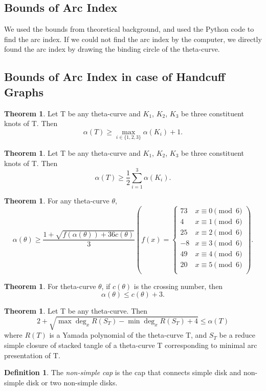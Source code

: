 \documentclass{article}
\theoremstyle{definition}
\newtheorem{defn}[thm]{Definition}
\theoremstyle{theorem}
\newtheorem{theorem}[thm]{Theorem}
\theoremstyle{proposition}
\theoremstyle{corollary}
\begin{document}
\subsection{Bounds of Arc Index}
We used the bounds from theoretical background, and used the Python code to find the arc index. If we could not find the arc index by the computer, we directly found the arc index by drawing the binding circle of the theta-curve.

\subsection{Bounds of Arc Index in case of Handcuff Graphs}
\begin{theorem}
Let T be any theta-curve and $K_1$, $K_2$, $K_3$ be three constituent knots of T. Then $$\alpha(T) \geq \underset{i \in \{1,2,3\}}\max \alpha(K_i) + 1.$$
\end{theorem}

\begin{theorem}
Let T be any theta-curve and $K_1$, $K_2$, $K_3$ be three constituent knots of T. Then $$\alpha(T) \geq \frac{1}{2}\sum_{i=1}^3\alpha(K_i).$$
\end{theorem}

\begin{theorem}
For any theta-curve $\theta$, $$\alpha(\theta)\geq\frac{1+\sqrt{f(\alpha(\theta))+36c(\theta)}}{3} \left(f(x) = \begin{cases} 
		73 & x \equiv 0 \pmod 6\\ 
		4 & x \equiv 1 \pmod 6\\ 
		25 & x \equiv 2 \pmod 6\\ 
		-8 & x \equiv 3 \pmod 6\\ 
		49 & x \equiv 4 \pmod 6\\ 
		20 & x \equiv 5 \pmod 6\\ 
     \end{cases} \right).$$
\end{theorem}

\begin{theorem}
For theta-curve $\theta$, if $c(\theta)$ is the crossing number, then $$\alpha(\theta) \leq c(\theta) + 3.$$
\end{theorem}

\begin{theorem}
Let T be any theta-curve. Then $$2+\sqrt{\max\deg_x R(S_T) - \min\deg_x R(S_T) + 4} \leq \alpha(T)$$ where $R(T)$ is a Yamada polynomial of the theta-curve T, and $S_{T}$ be a reduce simple closure of stacked tangle of a theta-curve T corresponding to minimal arc presentation of T.
\end{theorem}
\begin{defn}
    The \textit{non-simple cap} is the cap that connects simple disk and non-simple disk or two non-simple disks.
\end{defn}
\end{document}

